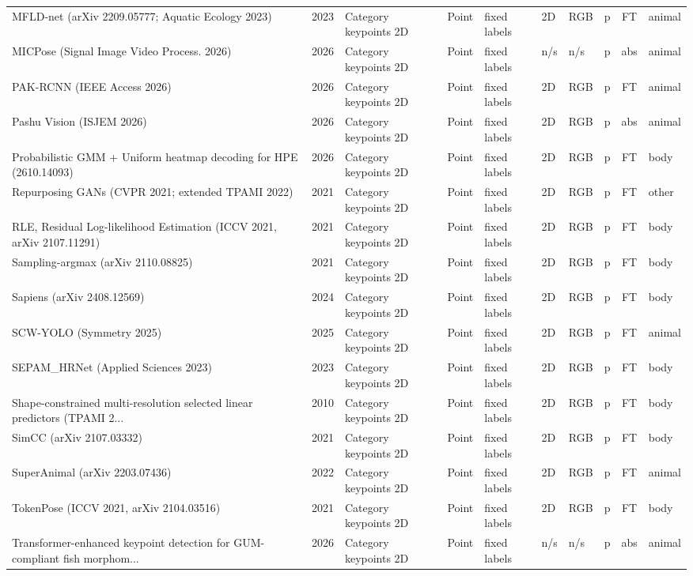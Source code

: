 {\begin{landscape}
\begin{longtable}{@{}p{4.6cm}rp{2.0cm}lllllcl@{}}
MFLD-net (arXiv 2209.05777; Aquatic Ecology 2023) & 2023 & Category keypoints 2D & Point & fixed labels & 2D & RGB & p & FT & animal \\
MICPose (Signal Image Video Process. 2026) & 2026 & Category keypoints 2D & Point & fixed labels & n/s & n/s & p & abs & animal \\
PAK-RCNN (IEEE Access 2026) & 2026 & Category keypoints 2D & Point & fixed labels & 2D & RGB & p & FT & animal \\
Pashu Vision (ISJEM 2026) & 2026 & Category keypoints 2D & Point & fixed labels & 2D & RGB & p & abs & animal \\
Probabilistic GMM + Uniform heatmap decoding for HPE (2610.14093) & 2026 & Category keypoints 2D & Point & fixed labels & 2D & RGB & p & FT & body \\
Repurposing GANs (CVPR 2021; extended TPAMI 2022) & 2021 & Category keypoints 2D & Point & fixed labels & 2D & RGB & p & FT & other \\
RLE, Residual Log-likelihood Estimation (ICCV 2021, arXiv 2107.11291) & 2021 & Category keypoints 2D & Point & fixed labels & 2D & RGB & p & FT & body \\
Sampling-argmax (arXiv 2110.08825) & 2021 & Category keypoints 2D & Point & fixed labels & 2D & RGB & p & FT & body \\
Sapiens (arXiv 2408.12569) & 2024 & Category keypoints 2D & Point & fixed labels & 2D & RGB & p & FT & body \\
SCW-YOLO (Symmetry 2025) & 2025 & Category keypoints 2D & Point & fixed labels & 2D & RGB & p & FT & animal \\
SEPAM\_HRNet (Applied Sciences 2023) & 2023 & Category keypoints 2D & Point & fixed labels & 2D & RGB & p & FT & body \\
Shape-constrained multi-resolution selected linear predictors (TPAMI 2... & 2010 & Category keypoints 2D & Point & fixed labels & 2D & RGB & p & FT & body \\
SimCC (arXiv 2107.03332) & 2021 & Category keypoints 2D & Point & fixed labels & 2D & RGB & p & FT & body \\
SuperAnimal (arXiv 2203.07436) & 2022 & Category keypoints 2D & Point & fixed labels & 2D & RGB & p & FT & animal \\
TokenPose (ICCV 2021, arXiv 2104.03516) & 2021 & Category keypoints 2D & Point & fixed labels & 2D & RGB & p & FT & body \\
Transformer-enhanced keypoint detection for GUM-compliant fish morphom... & 2026 & Category keypoints 2D & Point & fixed labels & n/s & n/s & p & abs & animal \\

\end{longtable}
\end{landscape}}
